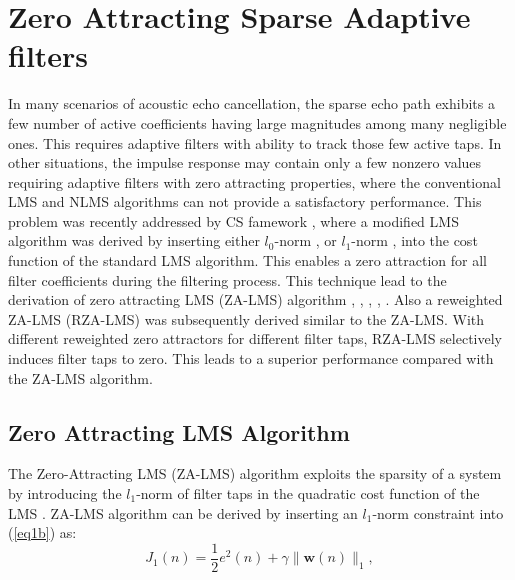\vspace{-0.3cm}
\section{Zero Attracting Sparse Adaptive filters}\label{sec:3.6}
\vspace{-0.5cm}
\noindent In many scenarios of acoustic echo cancellation, the sparse echo path exhibits a few number of active coefficients having large magnitudes among many negligible ones. This requires adaptive filters with ability to track those few active taps. In other situations, the impulse response may contain only a few nonzero values requiring adaptive filters with zero attracting properties, where the conventional LMS and NLMS algorithms can not provide a satisfactory performance. This problem was recently addressed by CS famework \cite{Dohono}, \cite{Candes2} where a modified LMS algorithm was derived by inserting either $l_0 $-norm \cite{Gu1}, \cite{Gu2} or $l_1$-norm \cite{Jin}, \cite{Shi} into the cost function of the standard LMS algorithm. This enables a zero attraction for all filter coefficients during the filtering process. This technique lead to the derivation of zero attracting LMS (ZA-LMS) algorithm \cite{Qing}, \cite{Hero}, \cite{Shukri}, \cite{Song3}, \cite{mujay1}. Also a reweighted ZA-LMS (RZA-LMS)  was subsequently derived similar to the ZA-LMS. With different reweighted zero attractors for different filter taps, RZA-LMS selectively induces filter taps to zero. This leads to a superior performance compared with the ZA-LMS algorithm.

\vspace{-0.3cm}
\subsection{Zero Attracting LMS Algorithm}\label{sec:3.6.1}
\vspace{-0.5cm}
\noindent  The Zero-Attracting LMS (ZA-LMS) algorithm exploits the sparsity of a system by introducing the $l_1$-norm of filter taps in the quadratic cost function of the LMS \cite{Hero}. ZA-LMS algorithm can be derived by inserting an $l_1$-norm constraint into (\ref{eq1b}) as:
\vspace{-0.6cm}
\begin{equation}
J_1(n)=\frac{1}{2}e^2(n)+\gamma\|\textbf{w}(n)\|_1, \label{16b}
\end{equation}

